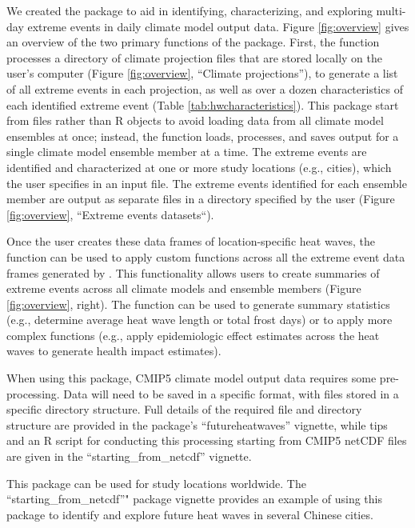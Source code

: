 We created the  package to aid in identifying,
characterizing, and exploring multi-day extreme events in daily climate
model output data. Figure \ref{fig:overview} gives an overview of the
two primary functions of the  package. First, the
 function processes a directory of climate projection
files that are stored locally on the user's computer (Figure
\ref{fig:overview}, ``Climate projections''), to generate a list of all
extreme events in each projection, as well as over a dozen
characteristics of each identified extreme event (Table
\ref{tab:hwcharacteristics}). This package start from files rather than
R objects to avoid loading data from all climate model ensembles at
once; instead, the function loads, processes, and saves output for a
single climate model ensemble member at a time. The extreme events are
identified and characterized at one or more study locations (e.g.,
cities), which the user specifies in an input file. The extreme events
identified for each ensemble member are output as separate files in a
directory specified by the user (Figure \ref{fig:overview}, ``Extreme
events datasets``).

Once the user creates these data frames of location-specific heat waves,
the  function can be used to apply custom
functions across all the extreme event data frames generated by
. This functionality allows users to create summaries
of extreme events across all climate models and ensemble members (Figure
\ref{fig:overview}, right). The function can be used to generate summary
statistics (e.g., determine average heat wave length or total frost
days) or to apply more complex functions (e.g., apply epidemiologic
effect estimates across the heat waves to generate health impact
estimates).

When using this package, CMIP5 climate model output data requires some
pre-processing. Data will need to be saved in a specific format, with
files stored in a specific directory structure. Full details of the
required file and directory structure are provided in the package's
``futureheatwaves'' vignette, while tips and an R script for conducting
this processing starting from CMIP5 netCDF files are given in the
``starting\_from\_netcdf'' vignette.

This package can be used for study locations worldwide. The
``starting\_from\_netcdf''" package vignette provides an example of
using this package to identify and explore future heat waves in several
Chinese cities.

